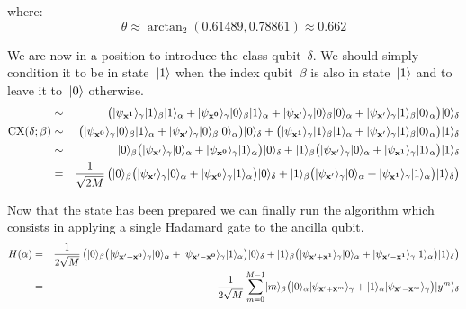 \documentclass{article}
\DeclarePairedDelimiter\ket{\lvert}{\rangle}
\begin{document}
\noindent where:
\begin{equation*}
\theta \approx \arctan_2(0.61489, 0.78861) \approx 0.662
\end{equation*}

\noindent We are now in a position to introduce the class qubit~$\delta$.  We should simply condition it to be in state~$\ket{1}$ when the index qubit~$\beta$ is also in state~$\ket{1}$ and to leave it to~$\ket{0}$ otherwise.
\begin{eqnarray*}
  &\sim& \big( \ket{\psi_{\bf x^1}}_\gamma \ket{1}_\beta \ket{1}_\alpha + \ket{\psi_{\bf x^0}}_\gamma \ket{0}_\beta \ket{1}_\alpha + \ket{\psi_{\bf x^\prime}}_\gamma \ket{0}_\beta \ket{0}_\alpha + \ket{\psi_{\bf x^\prime}}_\gamma \ket{1}_\beta \ket{0}_\alpha \big) \ket{0}_\delta \\
\mbox{CX}(\delta ; \beta) &\sim&  \big( \ket{\psi_{\bf x^0}}_\gamma \ket{0}_\beta \ket{1}_\alpha + \ket{\psi_{\bf x^\prime}}_\gamma \ket{0}_\beta \ket{0}_\alpha \big) \ket{0}_\delta + \big( \ket{\psi_{\bf x^1}}_\gamma \ket{1}_\beta \ket{1}_\alpha + \ket{\psi_{\bf x^\prime}}_\gamma \ket{1}_\beta \ket{0}_\alpha \big) \ket{1}_\delta \\
&\sim&  \ket{0}_\beta \big(  \ket{\psi_{\bf x^\prime}}_\gamma \ket{0}_\alpha  + \ket{\psi_{\bf x^0}}_\gamma  \ket{1}_\alpha \big) \ket{0}_\delta + \ket{1}_\beta \big(  \ket{\psi_{\bf x^\prime}}_\gamma \ket{0}_\alpha  + \ket{\psi_{\bf x^1}}_\gamma \ket{1}_\alpha \big) \ket{1}_\delta \\
&=& \frac{1}{\sqrt{2 M}} \left( \ket{0}_\beta \big(  \ket{\psi_{\bf x^\prime}}_\gamma \ket{0}_\alpha  + \ket{\psi_{\bf x^0}}_\gamma  \ket{1}_\alpha \big) \ket{0}_\delta + \ket{1}_\beta \big(  \ket{\psi_{\bf x^\prime}}_\gamma \ket{0}_\alpha  + \ket{\psi_{\bf x^1}}_\gamma \ket{1}_\alpha \big) \ket{1}_\delta \right)
\end{eqnarray*}

\noindent Now that the state has been prepared we can finally run the algorithm which consists in applying a single Hadamard gate to the ancilla qubit.
\begin{eqnarray*}
H(\alpha) &=& \frac{1}{2 \sqrt{M}} \left( \ket{0}_\beta \big(  \ket{\psi_{{\bf x^\prime} + {\bf x^0} } }_\gamma \ket{0}_\alpha  + \ket{\psi_{{\bf x^\prime} - {\bf x^0}}}_\gamma  \ket{1}_\alpha \big) \ket{0}_\delta + \ket{1}_\beta \big( \ket{\psi_{{\bf x^\prime} + {\bf x^1}}}_\gamma \ket{0}_\alpha  + \ket{\psi_{ {\bf x^\prime} - {\bf x^1} }}_\gamma \ket{1}_\alpha \big) \ket{1}_\delta \right)  \\
&=& \frac{1}{2 \sqrt{M}} \sum_{m=0}^{M-1} \ket{m}_{\beta} \big( \ket{0}_{\alpha} \ket{\psi_{ {\bf x^\prime} + {\bf x}^m  }}_{\gamma} + \ket{1}_{\alpha} \ket{\psi_{ {\bf x^\prime} - {\bf x}^m}  }_{\gamma} \big) \ket{y^m}_{\delta}
\end{eqnarray*}
\end{document}
